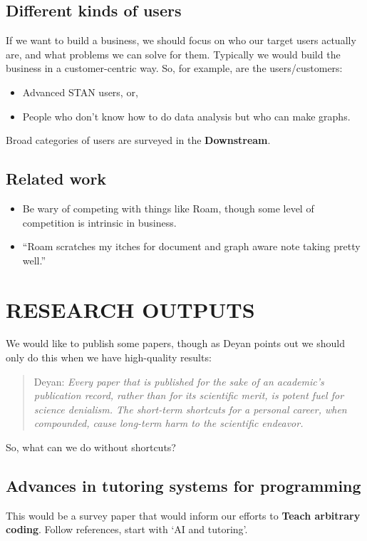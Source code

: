 \documentclass[11pt]{article}
\begin{document}
\subsection{Different kinds of users}
\label{sec:org3dcb616}

If we want to build a business, we should focus on who our target
users actually are, and what problems we can solve for them.
Typically we would build the business in a customer-centric way.  So,
for example, are the users/customers:

\begin{itemize}
\item Advanced STAN users, or,
\item People who don't know how to do data analysis but who can make graphs.
\end{itemize}

Broad categories of users are surveyed in the \textbf{Downstream}.

\subsection{Related work}
\label{sec:org3260f8f}

\begin{itemize}
\item Be wary of competing with things like Roam, though some level of competition is intrinsic in business.
\item “Roam scratches my itches for document and graph aware note taking pretty well.”
\end{itemize}
\section{RESEARCH OUTPUTS}
\label{sec:orgd5eb64e}
We would like to publish some papers, though as Deyan points out we
should only do this when we have high-quality results:

\begin{quote}
Deyan: \emph{Every paper that is published for the sake of an academic's publication record, rather than for its scientific merit, is potent fuel for science denialism. The short-term shortcuts for a personal career, when compounded, cause long-term harm to the scientific endeavor.}
\end{quote}

So, what can we do without shortcuts?

\subsection{Advances in tutoring systems for programming}
\label{sec:orgc1db117}
This would be a survey paper that would inform our efforts to \textbf{Teach arbitrary coding}.
Follow references, start with ‘AI and tutoring’.
\end{document}
